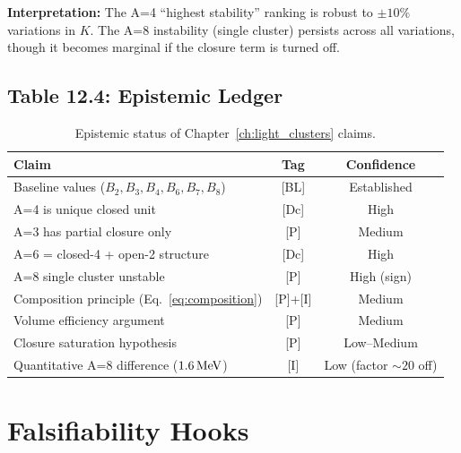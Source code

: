 \textbf{Interpretation:} The A=4 ``highest stability'' ranking is robust
to $\pm 10\%$ variations in $K$. The A=8 instability (single cluster)
persists across all variations, though it becomes marginal if the
closure term is turned off. \tagP

\subsection{Table 12.4: Epistemic Ledger}

\begin{table}[h]
\centering
\caption{Epistemic status of Chapter~\ref{ch:light_clusters} claims.}
\label{tab:light:epistemic}
\begin{tabular}{p{6cm}cc}
    \toprule
    Claim & Tag & Confidence \\
    \midrule
    Baseline values ($B_2, B_3, B_4, B_6, B_7, B_8$) & [BL] & Established \\
    A=4 is unique closed unit & [Dc] & High \\
    A=3 has partial closure only & [P] & Medium \\
    A=6 = closed-4 + open-2 structure & [Dc] & High \\
    A=8 single cluster unstable & [P] & High (sign) \\
    Composition principle (Eq.~\ref{eq:composition}) & [P]+[I] & Medium \\
    Volume efficiency argument & [P] & Medium \\
    Closure saturation hypothesis & [P] & Low--Medium \\
    Quantitative A=8 difference ($1.6\,\mathrm{MeV}$) & [I] & Low (factor $\sim 20$ off) \\
    \bottomrule
\end{tabular}
\end{table}

\section{Falsifiability Hooks}
\label{sec:light:falsify}

